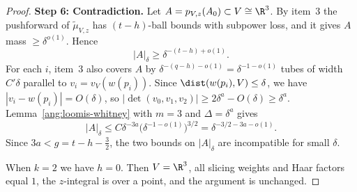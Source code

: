 \documentclass[11pt,reqno]{amsart}
\begin{document}
\begin{proof}
\textbf{Step 6: Contradiction.} Let $A=p_{V,z}(A_0)\subset V\cong\R^3$. By item~3 the pushforward of $\widetilde\mu_{V,z}$ has $(t-h)$-ball bounds with subpower loss, and it gives $A$ mass $\ge\delta^{o(1)}$. Hence
\[
|A|_\delta\ge\delta^{-(t-h)+o(1)}.
\]
For each $i$, item~3 also covers $A$ by $\delta^{-(q-h)-o(1)}=\delta^{-1-o(1)}$ tubes of width $C'\delta$ parallel to $v_i=v_V(w(p_i))$. Since $\dist(w(p_i),V)\le\delta$, we have $|v_i-w(p_i)|=O(\delta)$, so $|\det(v_0,v_1,v_2)|\ge2\delta^a-O(\delta)\ge\delta^a$. Lemma~\ref{ang:loomis-whitney} with $m=3$ and $\Delta=\delta^a$ gives
\[
|A|_\delta\le C\delta^{-3a}\big(\delta^{-1-o(1)}\big)^{3/2}=\delta^{-3/2-3a-o(1)} .
\]
Since $3a<g=t-h-\tfrac32$, the two bounds on $|A|_\delta$ are incompatible for small $\delta$.

When $k=2$ we have $h=0$. Then $V=\R^3$, all slicing weights and Haar factors equal $1$, the $z$-integral is over a point, and the argument is unchanged.
\end{proof}
\end{document}
